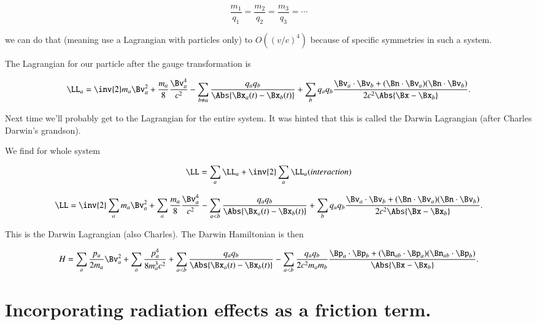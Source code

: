 \begin{equation}\label{eqn:relativisticElectrodynamicsL26:10}
\frac{m_1}{q_1} = \frac{m_2}{q_2} = \frac{m_3}{q_3} = \cdots
\end{equation}

we can do that (meaning use a Lagrangian with particles only) to $O((v/c)^4)$ because of specific symmetries in such a system.

The Lagrangian for our particle after the gauge transformation is

\begin{equation}\label{eqn:relativisticElectrodynamicsL26:30}
\LL_a = \inv{2} m_a \Bv_a^2 + \frac{m_a}{8} \frac{\Bv_a^4}{c^2} 
-\sum_{b \ne a} \frac{q_a q_b}{\Abs{\Bx_a(t) - \Bx_b(t)}}
+\sum_b q_a q_b \frac{\Bv_a \cdot \Bv_b + (\Bn \cdot \Bv_a) (\Bn \cdot \Bv_b)}{2 c^2 \Abs{\Bx - \Bx_b} }.
\end{equation}

Next time we'll probably get to the Lagrangian for the entire system.  It was hinted that this is called the Darwin Lagrangian (after Charles Darwin's grandson).

We find for whole system

\begin{equation}\label{eqn:relativisticElectrodynamicsL26:50}
\LL =  \sum_a \LL_a + \inv{2} \sum_a \LL_a (interaction)
\end{equation}

\begin{equation}\label{eqn:relativisticElectrodynamicsL26:70}
\LL = \inv{2} \sum_a m_a \Bv_a^2 + \sum_a \frac{m_a}{8} \frac{\Bv_a^4}{c^2} 
-\sum_{ a < b} \frac{q_a q_b}{\Abs{\Bx_a(t) - \Bx_b(t)}}
+\sum_b q_a q_b \frac{\Bv_a \cdot \Bv_b + (\Bn \cdot \Bv_a) (\Bn \cdot \Bv_b)}{2 c^2 \Abs{\Bx - \Bx_b} }.
\end{equation}

This is the Darwin Lagrangian (also Charles).  The Darwin Hamiltonian is then

\begin{equation}\label{eqn:relativisticElectrodynamicsL26:90}
H = \sum_a \frac{p_a}{2 m_a} \Bv_a^2 + \sum_a \frac{p_a^4}{8 m_a^3 c^2} 
+\sum_{ a < b} \frac{q_a q_b}{\Abs{\Bx_a(t) - \Bx_b(t)}}
- \sum_{ a < b } \frac{q_a q_b}{ 2 c^2 m_a m_b } \frac{\Bp_a \cdot \Bp_b + (\Bn_{a b} \cdot \Bp_a) (\Bn_{ a b } \cdot \Bp_b)}{\Abs{\Bx - \Bx_b} }.
\end{equation}

\section{Incorporating radiation effects as a friction term.}

